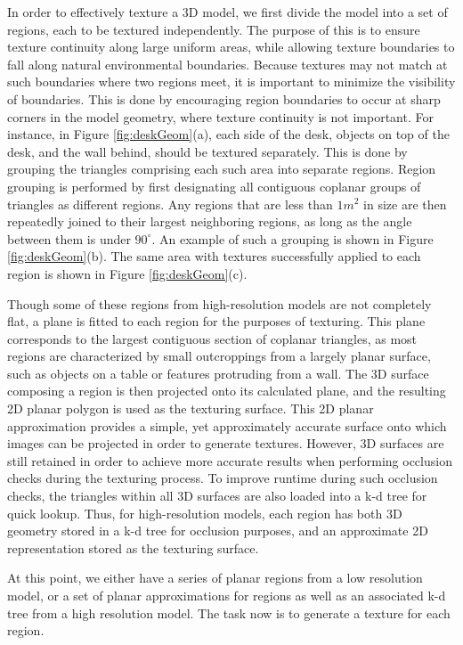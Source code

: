\documentclass[]{spie}  %
\begin{document}
In order to effectively texture a 3D model, we first divide the model
into a set of regions, each to be textured independently. The purpose
of this is to ensure texture continuity along large uniform areas,
while allowing texture boundaries to fall along natural environmental
boundaries. Because textures may not match at such boundaries where
two regions meet, it is important to minimize the visibility of
boundaries. This is done by encouraging region boundaries to occur at
sharp corners in the model geometry, where texture continuity is not
important. For instance, in Figure \ref{fig:deskGeom}(a), each side of
the desk, objects on top of the desk, and the wall behind, should be
textured separately. This is done by grouping the triangles comprising
each such area into separate regions. Region grouping is performed by
first designating all contiguous coplanar groups of triangles as
different regions. Any regions that are less than $1 m^2$ in size are
then repeatedly joined to their largest neighboring regions, as long
as the angle between them is under $90^{\circ}$. An example of such a
grouping is shown in Figure \ref{fig:deskGeom}(b). The same area with
textures successfully applied to each region is shown in Figure
\ref{fig:deskGeom}(c).

Though some of these regions from high-resolution models are not
completely flat, a plane is fitted to each region for the purposes of
texturing. This plane corresponds to the largest contiguous section of
coplanar triangles, as most regions are characterized by small
outcroppings from a largely planar surface, such as objects on a table
or features protruding from a wall. The 3D surface composing a region
is then projected onto its calculated plane, and the resulting 2D
planar polygon is used as the texturing surface. This 2D planar
approximation provides a simple, yet approximately accurate surface
onto which images can be projected in order to generate
textures. However, 3D surfaces are still retained in order to achieve
more accurate results when performing occlusion checks during the
texturing process. To improve runtime during such occlusion checks,
the triangles within all 3D surfaces are also loaded into a k-d tree
for quick lookup. Thus, for high-resolution models, each region has
both 3D geometry stored in a k-d tree for occlusion purposes, and an
approximate 2D representation stored as the texturing surface.

At this point, we either have a series of planar regions from a low
resolution model, or a set of planar approximations for regions as
well as an associated k-d tree from a high resolution model. The task
now is to generate a texture for each region.
\end{document}
